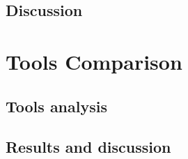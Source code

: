 \subsection{Discussion}

\section{Tools Comparison}
\label{sec:Tools-Comp}

\subsection{Tools analysis}

\subsection{Results and discussion}


